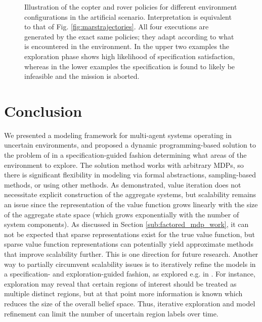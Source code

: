 \documentclass[conference]{IEEEtran}
\renewcommand{\cite}[1]{\citep{#1}}
\begin{document}
\begin{figure}
\begin{center}
	\end{center}
  \vspace{-4mm}
	\caption{Illustration of the copter and rover policies for different environment configurations in the artificial scenario. Interpretation is equivalent to that of Fig. \ref{fig:marstrajectories}. All four executions are generated by the exact same policies; they adapt according to what is encountered in the environment. In the upper two examples the exploration phase shows high likelihood of specification satisfaction, whereas in the lower examples the specification is found to likely be infeasible and the mission is aborted.}
	\label{fig:copter_executions}
\end{figure}


\section{Conclusion}
\label{sec:conclusion}

We presented a modeling framework for multi-agent systems operating in uncertain environments, and proposed a dynamic programming-based solution to the problem of in a specification-guided fashion determining what areas of the environment to explore. The solution method works with arbitrary MDPs, so there is significant flexibility in modeling via formal abstractions, sampling-based methods, or using other methods. As demonstrated, value iteration does not necessitate explicit construction of the aggregate systems, but scalability remains an issue since the representation of the value function grows linearly with the size of the aggregate state space (which grows exponentially with the number of system components). As discussed in Section \ref{sub:factored_mdp_work}, it can not be expected that sparse representations exist for the true value function, but sparse value function representations can potentially yield approximate methods that improve scalability further. This is one direction for future research. Another way to partially circumvent scalability issues is to iteratively refine the models in a specification- and exploration-guided fashion, as explored e.g. in \cite{Nilsson2017}. For instance, exploration may reveal that certain regions of interest should be treated as multiple distinct regions, but at that point more information is known which reduces the size of the overall belief space. Thus, iterative exploration and model refinement can limit the number of uncertain region labels over time.  




\end{document}
